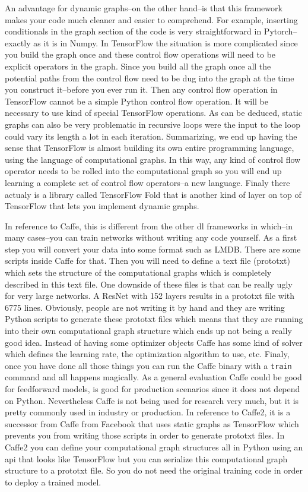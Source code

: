 \documentclass[11pt,a4paper]{article}
\begin{document}
An advantage for dynamic graphs--on the other hand--is that this framework makes your code much cleaner and easier to comprehend. For example, inserting conditionals in the graph section of the code is very straightforward in Pytorch--exactly as it is in Numpy. In TensorFlow the situation is more complicated since you build the graph once and these control flow operations will need to be explicit operators in the graph. Since you build all the graph once all the potential paths from the control flow need to be dug into the graph at the time you construct it--before you ever run it. Then any control flow operation in TensorFlow cannot be a simple Python control flow operation. It will be necessary to use kind of special TensorFlow operations. As can be deduced, static graphs can also be very problematic in recursive loops were the input to the loop could vary its length a lot in each iteration. Summarizing, we end up having the sense that TensorFlow is almost building its own entire programming language, using the language of computational graphs. In this way, any kind of control flow operator needs to be rolled into the computational graph so you will end up learning a complete set of control flow operators--a new language. Finaly there actualy is a library called TensorFlow Fold that is another kind of layer on top of TensorFlow that lets you implement dynamic graphs.

In reference to Caffe, this is different from the other \gls{dl} frameworks in which--in many cases--you can train networks without writing any code yourself. As a first step you will convert your data into some format such as LMDB. There are some scripts inside Caffe for that. Then you will need to define a text file (prototxt) which sets the structure of the computational graphs which is completely described in this text file. One downside of these files is that can be really ugly for very large networks. A ResNet with 152 layers results in a prototxt file with 6775 lines. Obviously, people are not writing it by hand and they are writing Python scripts to generate these prototxt files which means that they are running into their own computational graph structure which ends up not being a really good idea. Instead of having some optimizer objects Caffe has some kind of solver which defines the learning rate, the optimization algorithm to use, etc. Finaly, once you have done all those things you can run the Caffe binary with a \texttt{train} command and all happens magically. As a general evaluation Caffe could be good for feedforward models, is good for production scenarios since it does not depend on Python. Nevertheless Caffe is not being used for research very much, but it is pretty commonly used in industry or production. In reference to Caffe2, it is a successor from Caffe from Facebook that uses static graphs as TensorFlow which prevents you from writing those scripts in order to generate prototxt files. In Caffe2 you can define your computational graph structures all in Python using an \gls{api} that looks like TensorFlow but you can serialize this computational graph structure to a prototxt file. So you do not need the original training code in order to deploy a trained model.
\end{document}
